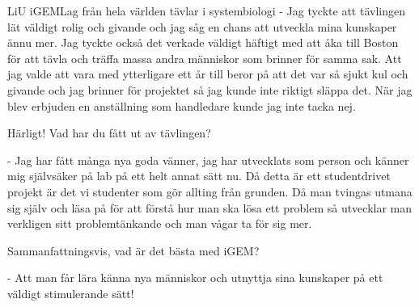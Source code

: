 \begin{news}{2}{LiU iGEM}{Lag från hela världen tävlar i systembiologi}{}{}
- Jag tyckte att tävlingen lät väldigt rolig och givande och jag såg
  en chans att utveckla mina kunskaper ännu mer. Jag tyckte också det
  verkade väldigt häftigt med att åka till Boston för att tävla och
  träffa massa andra människor som brinner för samma sak. Att jag
  valde att vara med ytterligare ett år till beror på att det var så
  sjukt kul och givande och jag brinner för projektet så jag kunde
  inte riktigt släppa det. När jag blev erbjuden en anställning som
  handledare kunde jag inte tacka nej.

Härligt! Vad har du fått ut av tävlingen?

- Jag har fått många nya goda vänner, jag har utvecklats som person
  och känner mig självsäker på lab på ett helt annat sätt nu. Då detta
  är ett studentdrivet projekt är det vi studenter som gör allting
  från grunden. Då man tvingas utmana sig själv och läsa på för att
  förstå hur man ska lösa ett problem så utvecklar man verkligen sitt
  problemtänkande och man vågar ta för sig mer.

Sammanfattningsvis, vad är det bästa med iGEM?

- Att man får lära känna nya människor och utnyttja sina kunskaper på
  ett väldigt stimulerande sätt!



%
%
%
%
\end{news}
